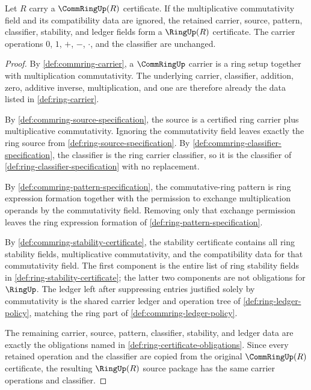 \begin{proposition}
\label{prop:commring-forgets-ring-certificate}
Let \(R\) carry a \(\CommRingUp(R)\) certificate. If the multiplicative
commutativity field and its compatibility data are ignored, the retained
carrier, source, pattern, classifier, stability, and ledger fields form a
\(\RingUp(R)\) certificate. The carrier operations \(0\), \(1\), \(+\),
\(-\), \(\cdot\), and the classifier are unchanged.
\end{proposition}
\begin{proof}
By \autoref{def:commring-carrier}, a \(\CommRingUp\) carrier is a ring setup
together with multiplication commutativity. The underlying carrier,
classifier, addition, zero, additive inverse, multiplication, and one are
therefore already the data listed in \autoref{def:ring-carrier}.

By \autoref{def:commring-source-specification}, the source is a certified ring
carrier plus multiplicative commutativity. Ignoring the commutativity field
leaves exactly the ring source from \autoref{def:ring-source-specification}.
By \autoref{def:commring-classifier-specification}, the classifier is the ring
carrier classifier, so it is the classifier of
\autoref{def:ring-classifier-specification} with no replacement.

By \autoref{def:commring-pattern-specification}, the commutative-ring pattern
is ring expression formation together with the permission to exchange
multiplication operands by the commutativity field. Removing only that exchange
permission leaves the ring expression formation of
\autoref{def:ring-pattern-specification}.

By \autoref{def:commring-stability-certificate}, the stability certificate
contains all ring stability fields, multiplicative commutativity, and the
compatibility data for that commutativity field. The first component is the
entire list of ring stability fields in \autoref{def:ring-stability-certificate};
the latter two components are not obligations for \(\RingUp\). The ledger left
after suppressing entries justified solely by commutativity is the shared
carrier ledger and operation tree of \autoref{def:ring-ledger-policy}, matching
the ring part of \autoref{def:commring-ledger-policy}.

The remaining carrier, source, pattern, classifier, stability, and ledger data
are exactly the obligations named in \autoref{def:ring-certificate-obligations}.
Since every retained operation and the classifier are copied from the original
\(\CommRingUp(R)\) certificate, the resulting \(\RingUp(R)\) source package has
the same carrier operations and classifier.
\end{proof}
